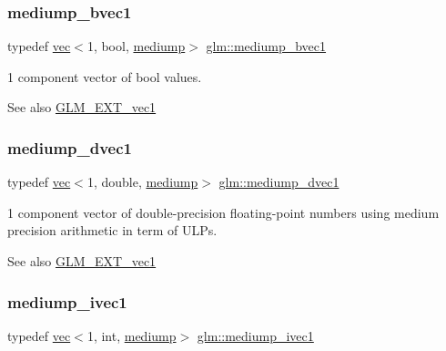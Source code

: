 \subsubsection{\texorpdfstring{mediump\+\_\+bvec1}{mediump\_bvec1}}
{\footnotesize\ttfamily typedef \hyperlink{structglm_1_1vec}{vec}$<$1, bool, \hyperlink{namespaceglm_a36ed105b07c7746804d7fdc7cc90ff25a6416f3ea0c9025fb21ed50c4d6620482}{mediump}$>$ \hyperlink{group__ext__vec1_ga1e19a89e380de140b1496a824d306155}{glm\+::mediump\+\_\+bvec1}}

1 component vector of bool values.

\begin{DoxySeeAlso}{See also}
\hyperlink{group__ext__vec1}{G\+L\+M\+\_\+\+E\+X\+T\+\_\+vec1} 
\end{DoxySeeAlso}
\mbox{\label{group__ext__vec1_gabfbd2538da41381bc96ee634944b9a28}} 
\subsubsection{\texorpdfstring{mediump\+\_\+dvec1}{mediump\_dvec1}}
{\footnotesize\ttfamily typedef \hyperlink{structglm_1_1vec}{vec}$<$1, double, \hyperlink{namespaceglm_a36ed105b07c7746804d7fdc7cc90ff25a6416f3ea0c9025fb21ed50c4d6620482}{mediump}$>$ \hyperlink{group__ext__vec1_gabfbd2538da41381bc96ee634944b9a28}{glm\+::mediump\+\_\+dvec1}}

1 component vector of double-\/precision floating-\/point numbers using medium precision arithmetic in term of U\+L\+Ps.

\begin{DoxySeeAlso}{See also}
\hyperlink{group__ext__vec1}{G\+L\+M\+\_\+\+E\+X\+T\+\_\+vec1} 
\end{DoxySeeAlso}
\mbox{\label{group__ext__vec1_gaa3adbc518fe07a292115c7662327effc}} 
\subsubsection{\texorpdfstring{mediump\+\_\+ivec1}{mediump\_ivec1}}
{\footnotesize\ttfamily typedef \hyperlink{structglm_1_1vec}{vec}$<$1, int, \hyperlink{namespaceglm_a36ed105b07c7746804d7fdc7cc90ff25a6416f3ea0c9025fb21ed50c4d6620482}{mediump}$>$ \hyperlink{group__ext__vec1_gaa3adbc518fe07a292115c7662327effc}{glm\+::mediump\+\_\+ivec1}}

